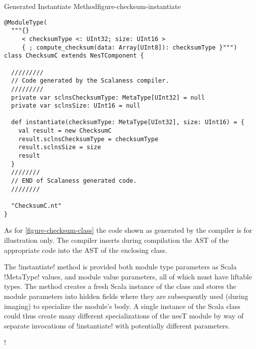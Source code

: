 \singlespace
\begin{fpfig}[tbhp]{Generated Instantiate Method}{figure-checksum-instantiate}
{
\begin{lstlisting}[language=scalaness]
@ModuleType(
  """{}
     < checksumType <: UInt32; size: UInt16 >
     { ; compute_checksum(data: Array[UInt8]): checksumType }""")
class ChecksumC extends NesTComponent {

  /////////
  // Code generated by the Scalaness compiler.
  /////////
  private var sclnsChecksumType: MetaType[UInt32] = null
  private var sclnsSize: UInt16 = null

  def instantiate(checksumType: MetaType[UInt32], size: UInt16) = {
    val result = new ChecksumC
    result.sclnsChecksumType = checksumType
    result.sclnsSize = size
    result
  }
  ////////
  // END of Scalaness generated code.
  //////// 
           
  "ChecksumC.nt"
}
\end{lstlisting}
}
\end{fpfig}
\primaryspacing

As for \autoref{figure-checksum-class} the code shown as generated by the compiler is for
illustration only. The compiler inserts during compilation the AST of the appropriate code into
the AST of the enclosing class.

The !instantiate! method is provided both module type parameters as Scala !MetaType! values, and
module value parameters, all of which must have liftable types. The method creates a fresh Scala
instance of the class and stores the module parameters into hidden fields where they are
subsequently used (during imaging) to specialize the module's body. A single instance of the
Scala class could thus create many different specializations of the nesT module by way of
separate invocations of !instantiate! with potentially different parameters.

\lstDeleteShortInline!

